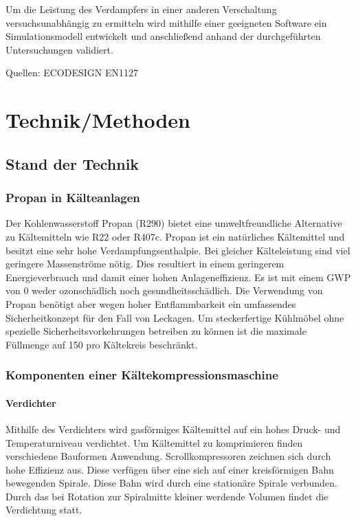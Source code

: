 Um die Leistung des Verdampfers in einer anderen Verschaltung versuchsunabhängig zu ermitteln wird mithilfe einer geeigneten Software ein Simulationsmodell entwickelt und anschließend anhand der durchgeführten Untersuchungen validiert.

Quellen:
ECODESIGN
EN1127


\chapter{Technik/Methoden}
\label{cha:Technik}

\section{Stand der Technik}
\label{sec:Stand der Technik}

\subsection{Propan in Kälteanlagen}
\label{subsec:Propan in Kälteanlagen}

Der Kohlenwasserstoff Propan (R290) bietet eine umweltfreundliche Alternative zu Kältemitteln wie R22 oder R407c. Propan ist ein natürliches Kältemittel und besitzt eine sehr hohe Verdampfungsenthalpie. Bei gleicher Kälteleistung sind viel geringere Massenströme nötig. Dies resultiert in einem geringerem Energieverbrauch und damit einer hohen Anlageneffizienz.
Es ist mit einem GWP von 0 weder ozonschädlich noch gesundheitsschädlich. Die Verwendung von Propan benötigt aber wegen hoher Entflammbarkeit ein umfassendes Sicherheitkonzept für den Fall von Leckagen\cite{BitzerKuhlmaschinenGmbH.2014}\cite{Huber.2011}.
Um steckerfertige Kühlmöbel ohne spezielle Sicherheitsvorkehrungen betreiben zu können ist die maximale Füllmenge auf \unit{150}{\gram} pro Kältekreis beschränkt.



\subsection{Komponenten einer Kältekompressionsmaschine}
\label{subsec:Komponenten einer Kältekompressionsmaschine}

\subsubsection{Verdichter}
\label{subsubsec:Verdichter}

Mithilfe des Verdichters wird gasförmiges Kältemittel auf ein hohes Druck- und Temperaturniveau verdichtet. Um Kältemittel zu komprimieren finden verschiedene Bauformen Anwendung. Scrollkompressoren zeichnen sich durch hohe Effizienz aus. Diese verfügen über eine sich auf einer kreisförmigen Bahn bewegenden Spirale. Diese Bahn wird durch eine stationäre Spirale verbunden. Durch das bei Rotation zur Spiralmitte kleiner werdende Volumen findet die Verdichtung statt.


